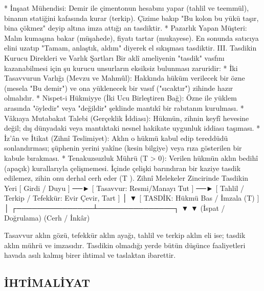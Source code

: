 \documentclass[11pt,a4paper]{article}
\begin{document}
 * İnşaat Mühendisi: Demir ile çimentonun hesabını yapar (tahlil ve teemmül), binanın statiğini kafasında kurar (terkip). Çizime bakıp "Bu kolon bu yükü taşır, bina çökmez" deyip altına imza attığı an tasdiktir.
 * Pazarlık Yapan Müşteri: Malın kumaşına bakar (müşahede), fiyatı tartar (mukayese). En sonunda satıcıya elini uzatıp "Tamam, anlaştık, aldım" diyerek el sıkışması tasdiktir.
III. Tasdikin Kurucu Direkleri ve Varlık Şartları
Bir aklî ameliyenin "tasdik" vasfını kazanabilmesi için şu kurucu unsurların eksiksiz bulunması zaruridir:
 * İki Tasavvurun Varlığı (Mevzu ve Mahmûl): Hakkında hüküm verilecek bir özne (mesela "Bu demir") ve ona yüklenecek bir vasıf ("sıcaktır") zihinde hazır olmalıdır.
 * Nispet-i Hükmiyye (İki Ucu Birleştiren Bağ): Özne ile yüklem arasında "öyledir" veya "değildir" şeklinde mantıkî bir rabıtanın kurulması.
 * Vâkıaya Mutabakat Talebi (Gerçeklik İddiası): Hükmün, zihnin keyfî hevesine değil; dış dünyadaki veya mantıktaki nesnel hakikate uygunluk iddiası taşıması.
 * İz'ân ve İtikat (Zihnî Teslimiyet): Aklın o hükmü kabul edip tereddüdü sonlandırması; şüphenin yerini yakîne (kesin bilgiye) veya rıza gösterilen bir kabule bırakması.
 * Tenakuzsuzluk Mührü (T > 0): Verilen hükmün aklın bedihî (apaçık) kurallarıyla çelişmemesi. İçinde çelişki barındıran bir kaziye tasdik edilemez, zihin onu derhal cerh eder (T ).
Zihnî Melekeler Zincirinde Tasdikin Yeri
[ Girdi / Duyu ] ──► [ Tasavvur: Resmi/Manayı Tut ] ──► [ Tahlil / Terkip / Tefekkür: Evir Çevir, Tart ]
                                                                       │
                                                                       ▼
                                                  [ TASDİK: Hükmü Bas / İmzala (T) ]
                                                                       │
                                                       ┌───────────────┴───────────────┐
                                                       ▼                               ▼
                                               (İspat / Doğrulama)              (Cerh / İnkâr)

Tasavvur aklın gözü, tefekkür aklın ayağı, tahlil ve terkip aklın eli ise; tasdik aklın mührü ve imzasıdır. Tasdikin olmadığı yerde bütün düşünce faaliyetleri havada asılı kalmış birer ihtimal ve taslaktan ibarettir.



\subsection{İHTİMALİYAT}
\end{document}
